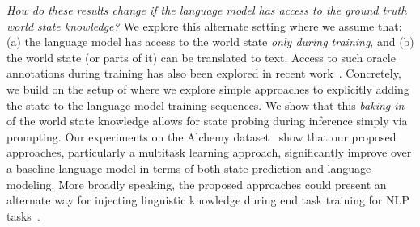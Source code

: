 \documentclass[12pt]{thesis-umich}[thesis]
\begin{document}
\emph{How do these results change if the language model has access to the ground truth world state knowledge?} 
We explore this alternate setting where we assume that: (a) the language model has access to the world state \emph{only during training}, and (b) the world state (or parts of it) can be translated to text. 
Access to such oracle annotations during training has also been explored in recent work~\cite{nye2021show, lampinen2022explanation}.
Concretely, we build on the setup of \citet{li-etal-2021-implicit} where 
we explore simple approaches to explicitly adding the state to the language model training sequences.
We show that this \emph{baking-in} of the world state knowledge allows for state probing during inference simply via prompting. 
Our experiments on the Alchemy dataset~\cite{long-etal-2016-simpler} show that our proposed approaches, particularly a multitask learning approach, significantly improve over a baseline language model in terms of both state prediction  and language modeling. 
More broadly speaking, the proposed approaches could present an alternate way for injecting linguistic knowledge during end task training for NLP tasks~\cite{wu2021infusing}.  
\end{document}
